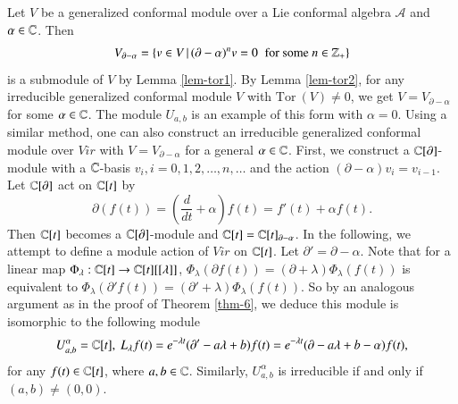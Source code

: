 \documentclass[12pt]{amsart}
\begin{document}
\begin{rmk}Let $V$ be a generalized conformal module over a Lie conformal algebra $\mathcal{A}$ and $\alpha\in\mathbb{C}$. Then $$V_{\partial-\alpha}=\{v\in V\,|\,(\partial-\alpha)^nv=0\;\;\text{for some $ n\in\mathbb{Z}_+$}\}$$ is a submodule of $V$ by Lemma \ref{lem-tor1}. By Lemma \ref{lem-tor2}, for any irreducible generalized conformal module $V$ with $\text{Tor}~(V)\neq 0$, %
we get $V=V_{\partial-\alpha}$ for some $\alpha\in\mathbb{C}$.
The module $U_{a,b}$ is an example of this form with $\alpha=0$.
Using a similar method, one can also construct an irreducible generalized conformal module over $Vir$ with $V=V_{\partial-\alpha}$ for a general $\alpha\in\mathbb{C}$.
First, we construct a $\mathbb{C}[\partial]$-module with a $\mathbb{C}$-basis $v_i, i=0,1,2,\ldots, n, \ldots$ and the action $(\partial -\alpha)v_i=v_{i-1}$. Let $\mathbb{C}[\partial]$ act on $\mathbb{C}[t]$ by $$\partial(f(t))=(\frac{d}{dt}+\alpha)f(t)=f'(t)+\alpha f(t).$$ Then $\mathbb{C}[t]$ becomes a $\mathbb{C}[\partial]$-module and $\mathbb{C}[t]=\mathbb{C}[t]_{\partial-\alpha}$. In the following, we attempt to define a module action of $Vir$ on $\mathbb{C}[t]$.
Let $\partial'=\partial-\alpha$.
Note that for a linear map $\Phi_\lambda: \mathbb{C}[t]\rightarrow \mathbb{C}[t][[\lambda]]$,  $\Phi_\lambda(\partial f(t))=(\partial+\lambda)\Phi_\lambda(f(t))$ is equivalent to
$\Phi_\lambda(\partial' f(t))=(\partial'+\lambda)\Phi_\lambda(f(t))$. So by an analogous argument as in the proof of Theorem \ref{thm-6}, we deduce this module is isomorphic to the following module
$$U^\alpha_{a,b}=\mathbb{C}[t],\ L_\lambda f(t)
=e^{-\lambda t}(\partial'-a \lambda+b)f(t)
=e^{-\lambda t}(\partial-a \lambda+b-\alpha)f(t),
$$
for any $f(t)\in\mathbb{C}[t]$, where $a,b\in\mathbb{C}$.
Similarly, $U^\alpha_{a,b}$ is irreducible if and only if $(a,b)\neq(0,0)$.
\end{rmk}
\end{document}
